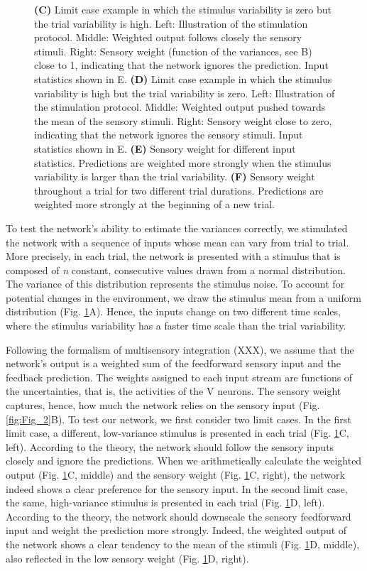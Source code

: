 \documentclass[10pt,a4paper,draft]{article}
\begin{document}
\begin{figure}[t!]
{{\bf (C)} Limit case example in which the stimulus variability is zero but the trial variability is high. Left: Illustration of the stimulation protocol. Middle: Weighted output follows closely the sensory stimuli. Right: Sensory weight (function of the variances, see B) close to 1, indicating that the network ignores the prediction. Input statistics shown in E.
{\bf (D)} Limit case example in which the stimulus variability is high but the trial variability is zero. Left: Illustration of the stimulation protocol. Middle: Weighted output pushed towards the mean of the sensory stimuli. Right: Sensory weight close to zero, indicating that the network ignores the sensory stimuli. Input statistics shown in E.
{\bf (E)} Sensory weight for different input statistics. Predictions are weighted more strongly when the stimulus variability is larger than the trial variability.
{\bf (F)} Sensory weight throughout a trial for two different trial durations. Predictions are weighted more strongly at the beginning of a new trial. 
}
\label{fig:Fig_3}
\end{figure}
%

To test the network's ability to estimate the variances correctly, we stimulated the network with a sequence of inputs whose mean can vary from trial to trial. More precisely, in each trial, the network is presented with a stimulus that is composed of \textit{n} constant, consecutive values drawn from a normal distribution. The variance of this distribution represents the stimulus noise. To account for potential changes in the environment, we draw the stimulus mean from a uniform distribution (Fig. \ref{fig:Fig_3}A). Hence, the inputs change on two different time scales, where the stimulus variability has a faster time scale than the trial variability.

Following the formalism of multisensory integration (XXX), we assume that the network's output is a weighted sum of the feedforward sensory input and the feedback prediction. The weights assigned to each input stream are functions of the uncertainties, that is, the activities of the V neurons. The sensory weight captures, hence, how much the network relies on the sensory input (Fig. \ref{fig:Fig_2}B). To test our network, we first consider two limit cases. In the first limit case, a different, low-variance stimulus is presented in each trial (Fig. \ref{fig:Fig_3}C, left). According to the theory, the network should follow the sensory inputs closely and ignore the predictions. When we arithmetically calculate the weighted output (Fig. \ref{fig:Fig_3}C, middle) and the sensory weight (Fig. \ref{fig:Fig_3}C, right), the network indeed shows a clear preference for the sensory input. In the second limit case, the same, high-variance stimulus is presented in each trial (Fig. \ref{fig:Fig_3}D, left). According to the theory, the network should downscale the sensory feedforward input and weight the prediction more strongly. Indeed, the weighted output of the network shows a clear tendency to the mean of the stimuli (Fig. \ref{fig:Fig_3}D, middle), also reflected in the low sensory weight (Fig. \ref{fig:Fig_3}D, right). 
\end{document}
